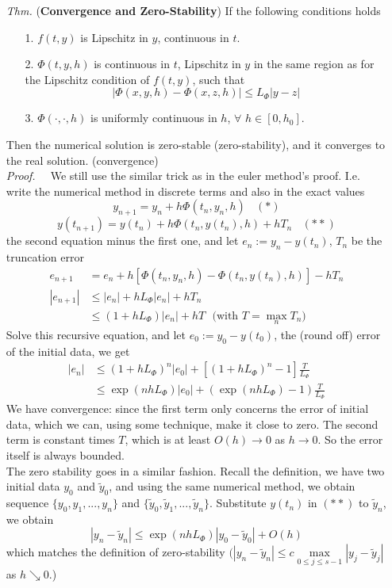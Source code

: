 \documentclass[a4paper, 11pt]{article}
\begin{document}
\begin{itemize}
	\item[\textit{Thm.}] (\textbf{Convergence and Zero-Stability}) If the following conditions holds
	\begin{itemize}
		\item[1.] $f(t,y)$ is Lipschitz in $y$, continuous in $t$.
		\item[2.] $\Phi(t,y,h)$ is continuous in $t$, Lipschitz in $y$ in the same region as for the Lipschitz condition of $f(t,y)$, such that
		$$
		|\Phi(x,y,h)-\Phi(x,z,h)| \leq L_{\Phi} |y-z|
		$$
		\item[3.] $\Phi(\cdot, \cdot, h)$ is uniformly continuous in $h$, $\forall$ $h\in [0,h_0]$.
	\end{itemize}
	Then the numerical solution is zero-stable (zero-stability), and it converges to the real solution. (convergence) \\
	\textit{Proof.~~} We still use the similar trick as in the euler method's proof. I.e. write the numerical method in discrete terms and also in the exact values
	$$
	y_{n+1} = y_n + h\Phi(t_n, y_n, h)~~~~(*)
	$$
	$$
	y(t_{n+1}) = y(t_n) + h\Phi(t_n, y(t_n), h) + hT_n~~~~(**)
	$$
	the second equation minus the first one, and let $e_n:=y_{n}-y(t_n)$, $T_n$ be the truncation error
	\begin{equation}
		\begin{split}
			e_{n+1} &= e_n + h\left[\Phi(t_n,y_n,h) - \Phi(t_n,y(t_n),h)\right] - hT_n\\
			|e_{n+1}| &\leq |e_n| + hL_{\Phi}|e_n| + hT_n \\
			&\leq (1+hL_{\Phi}) |e_n| + hT~~~\text{(with $T=\max\limits_{n} T_n$)}
		\end{split}
	\end{equation}
	Solve this recursive equation, and let $e_0:=y_0-y(t_0)$, the (round off) error of the initial data, we get
	\begin{equation}
		\begin{split}
			|e_{n}| &\leq (1+hL_{\Phi})^n |e_0| + [(1+hL_{\Phi})^n -1 ] \frac{T}{L_{\Phi}} \\
			&\leq \exp(nhL_{\Phi}) |e_0| + (\exp(nhL_{\Phi}) - 1)\frac{T}{L_{\Phi}}
		\end{split}
	\end{equation}
	We have convergence: since the first term only concerns the error of initial data, which we can, using some technique, make it close to zero. The second term is constant times $T$, which is at least $O(h)\to 0$ as $h\to 0$. So the error itself is always bounded. \\
	The zero stability goes in a similar fashion. Recall the definition, we have two initial data $y_0$ and $\tilde{y}_0$, and using the same numerical method, we obtain sequence $\{y_0, y_1, ..., y_n\}$ and $\{\tilde{y}_0, \tilde{y}_1, ..., \tilde{y}_n\}$. Substitute $y(t_n)$ in $(**)$ to $\tilde{y}_n$, we obtain
	$$
	|y_n - \tilde{y}_n| \leq \exp(nhL_{\Phi})|y_0-\tilde{y}_0| + O(h)
	$$
	which matches the definition of zero-stability $(|y_n - \tilde{y}_n| \leq c \max\limits_{0\leq j\leq s-1}|y_j-\tilde{y}_j|$ as $h\searrow 0$.)
\end{itemize}
\end{document}
